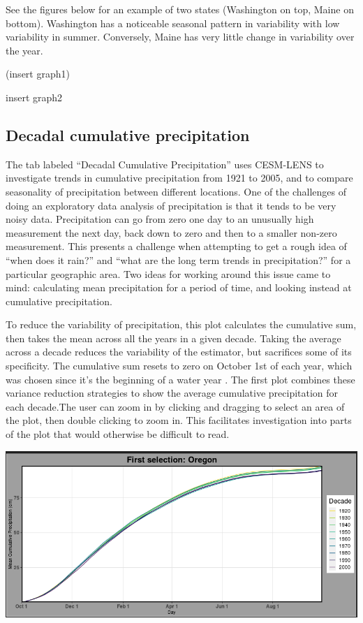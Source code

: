 \documentclass[10pt,letterpaper]{article}
\begin{document}
See the figures below for an example of two states (Washington on top, Maine on bottom). Washington has a noticeable seasonal pattern in variability with low variability in summer. Conversely, Maine has very little change in variability over the year.

(insert graph1)

insert graph2


\subsection*{Decadal cumulative precipitation}

The tab labeled “Decadal Cumulative Precipitation” uses CESM-LENS to investigate trends in cumulative precipitation from 1921 to 2005, and to compare seasonality of precipitation between different locations. One of the challenges of doing an exploratory data analysis of precipitation is that it tends to be very noisy data. Precipitation can go from zero one day to an unusually high measurement the next day, back down to zero and then to a smaller non-zero measurement. This presents a challenge when attempting to get a rough idea of “when does it rain?” and “what are the long term trends in precipitation?” for a particular geographic area. Two ideas for working around this issue came to mind: calculating mean precipitation for a period of time, and looking instead at cumulative precipitation.

To reduce the variability of precipitation, this plot calculates the cumulative sum, then takes the mean across all the years in a given decade. Taking the average across a decade reduces the variability of the estimator, but sacrifices some of its specificity. The cumulative sum resets to zero on October 1st of each year, which was chosen since it’s the beginning of a water year \cite{usgs}. The first plot combines these variance reduction strategies to show the average cumulative precipitation for each decade.The user can zoom in by clicking and dragging to select an area of the plot, then double clicking to zoom in. This facilitates investigation into parts of the plot that would otherwise be difficult to read.

\begin{center}
  \includegraphics[width = .8\textwidth]{graphics/cumulative}
\end{center}
\end{document}
